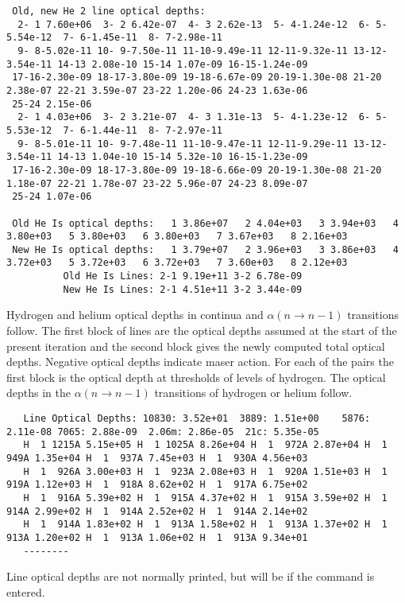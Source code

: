 {\begin{verbatim}
 Old, new He 2 line optical depths:
  2- 1 7.60e+06  3- 2 6.42e-07  4- 3 2.62e-13  5- 4-1.24e-12  6- 5-5.54e-12  7- 6-1.45e-11  8- 7-2.98e-11
  9- 8-5.02e-11 10- 9-7.50e-11 11-10-9.49e-11 12-11-9.32e-11 13-12-3.54e-11 14-13 2.08e-10 15-14 1.07e-09 16-15-1.24e-09
 17-16-2.30e-09 18-17-3.80e-09 19-18-6.67e-09 20-19-1.30e-08 21-20 2.38e-07 22-21 3.59e-07 23-22 1.20e-06 24-23 1.63e-06
 25-24 2.15e-06
  2- 1 4.03e+06  3- 2 3.21e-07  4- 3 1.31e-13  5- 4-1.23e-12  6- 5-5.53e-12  7- 6-1.44e-11  8- 7-2.97e-11
  9- 8-5.01e-11 10- 9-7.48e-11 11-10-9.47e-11 12-11-9.29e-11 13-12-3.54e-11 14-13 1.04e-10 15-14 5.32e-10 16-15-1.23e-09
 17-16-2.30e-09 18-17-3.80e-09 19-18-6.66e-09 20-19-1.30e-08 21-20 1.18e-07 22-21 1.78e-07 23-22 5.96e-07 24-23 8.09e-07
 25-24 1.07e-06

 Old He Is optical depths:   1 3.86e+07   2 4.04e+03   3 3.94e+03   4 3.80e+03   5 3.80e+03   6 3.80e+03   7 3.67e+03   8 2.16e+03
 New He Is optical depths:   1 3.79e+07   2 3.96e+03   3 3.86e+03   4 3.72e+03   5 3.72e+03   6 3.72e+03   7 3.60e+03   8 2.12e+03
          Old He Is Lines: 2-1 9.19e+11 3-2 6.78e-09
          New He Is Lines: 2-1 4.51e+11 3-2 3.44e-09
\end{verbatim}
}

Hydrogen and helium optical depths in continua and
$\alpha(n \to n-1)$ transitions follow.
The first block of lines are the optical depths assumed at the
start of the present iteration and the second block gives the newly computed
total optical depths.
Negative optical depths indicate maser action.
For
each of the pairs the first block is the optical depth at thresholds of
levels of hydrogen.
The optical depths in the $\alpha(n \to n-1)$ transitions of
hydrogen or helium follow.
{\setverbatimfontsize{\tiny}
\begin{verbatim}
   Line Optical Depths: 10830: 3.52e+01  3889: 1.51e+00    5876: 2.11e-08 7065: 2.88e-09  2.06m: 2.86e-05  21c: 5.35e-05
   H  1 1215A 5.15e+05 H  1 1025A 8.26e+04 H  1  972A 2.87e+04 H  1  949A 1.35e+04 H  1  937A 7.45e+03 H  1  930A 4.56e+03
   H  1  926A 3.00e+03 H  1  923A 2.08e+03 H  1  920A 1.51e+03 H  1  919A 1.12e+03 H  1  918A 8.62e+02 H  1  917A 6.75e+02
   H  1  916A 5.39e+02 H  1  915A 4.37e+02 H  1  915A 3.59e+02 H  1  914A 2.99e+02 H  1  914A 2.52e+02 H  1  914A 2.14e+02
   H  1  914A 1.83e+02 H  1  913A 1.58e+02 H  1  913A 1.37e+02 H  1  913A 1.20e+02 H  1  913A 1.06e+02 H  1  913A 9.34e+01
   --------
 \end{verbatim}
}

 Line optical depths are not normally printed, but will be if the
   command is entered.
  
